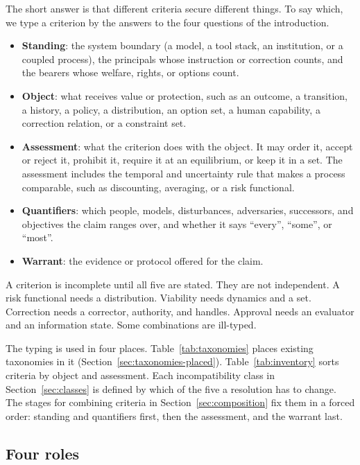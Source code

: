 \documentclass[11pt]{article}
\begin{document}
The short answer is that different criteria secure different things.
To say which, we type a criterion by the answers to the four questions of the introduction.
\begin{itemize}[leftmargin=1.5em,itemsep=0pt]
  \item \textbf{Standing}: the system boundary (a model, a tool stack, an institution, or a coupled process), the principals whose instruction or correction counts, and the bearers whose welfare, rights, or options count.
  \item \textbf{Object}: what receives value or protection, such as an outcome, a transition, a history, a policy, a distribution, an option set, a human capability, a correction relation, or a constraint set.
  \item \textbf{Assessment}: what the criterion does with the object. It may order it, accept or reject it, prohibit it, require it at an equilibrium, or keep it in a set. The assessment includes the temporal and uncertainty rule that makes a process comparable, such as discounting, averaging, or a risk functional.
  \item \textbf{Quantifiers}: which people, models, disturbances, adversaries, successors, and objectives the claim ranges over, and whether it says ``every'', ``some'', or ``most''.
  \item \textbf{Warrant}: the evidence or protocol offered for the claim.
\end{itemize}
A criterion is incomplete until all five are stated.
They are not independent.
A risk functional needs a distribution.
Viability needs dynamics and a set.
Correction needs a corrector, authority, and handles.
Approval needs an evaluator and an information state.
Some combinations are ill-typed.

The typing is used in four places.
Table~\ref{tab:taxonomies} places existing taxonomies in it (Section~\ref{sec:taxonomies-placed}).
Table~\ref{tab:inventory} sorts criteria by object and assessment.
Each incompatibility class in Section~\ref{sec:classes} is defined by which of the five a resolution has to change.
The stages for combining criteria in Section~\ref{sec:composition} fix them in a forced order: standing and quantifiers first, then the assessment, and the warrant last.

\subsection{Four roles}
\end{document}
